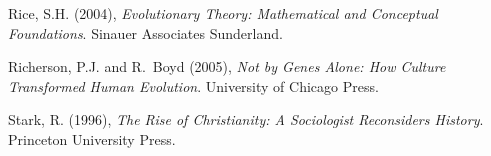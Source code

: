 \documentclass[11pt]{article}
\begin{document}
\begin{thebibliography}{32}
Rice, S.H. (2004), \emph{Evolutionary Theory: Mathematical and Conceptual
  Foundations}. Sinauer Associates Sunderland.

Richerson, P.J. and R.~Boyd (2005), \emph{Not by Genes Alone: How Culture
  Transformed Human Evolution}. University of Chicago Press.

Stark, R. (1996), \emph{The Rise of Christianity: A Sociologist Reconsiders
  History}. Princeton University Press.

\end{thebibliography}
\end{document}
